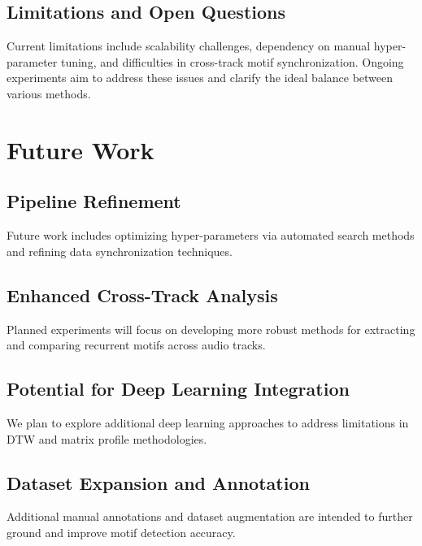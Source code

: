 \documentclass[conference]{IEEEtran}
\begin{document}
\subsection{Limitations and Open Questions}
Current limitations include scalability challenges, dependency on manual hyper-parameter tuning, and difficulties in cross-track motif synchronization. Ongoing experiments aim to address these issues and clarify the ideal balance between various methods.

\section{Future Work}

\subsection{Pipeline Refinement}
Future work includes optimizing hyper-parameters via automated search methods and refining data synchronization techniques.

\subsection{Enhanced Cross-Track Analysis}
Planned experiments will focus on developing more robust methods for extracting and comparing recurrent motifs across audio tracks.

\subsection{Potential for Deep Learning Integration}
We plan to explore additional deep learning approaches to address limitations in DTW and matrix profile methodologies.

\subsection{Dataset Expansion and Annotation}
Additional manual annotations and dataset augmentation are intended to further ground and improve motif detection accuracy.
\end{document}
